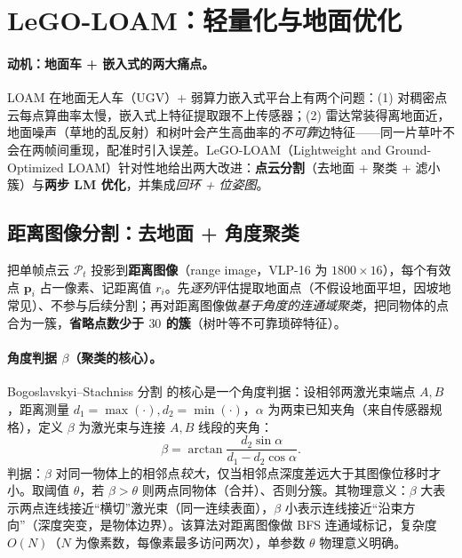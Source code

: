 \section{LeGO-LOAM：轻量化与地面优化}
\label{sec:lidar-lego}

\paragraph{动机：地面车 + 嵌入式的两大痛点。}
LOAM 在地面无人车（UGV）+ 弱算力嵌入式平台上有两个问题\cite{shan2018legoloam}：(1) 对稠密点云每点算曲率太慢，嵌入式上特征提取跟不上传感器；(2) 雷达常装得离地面近，地面噪声（草地的乱反射）和树叶会产生高曲率的\emph{不可靠}边特征——同一片草叶不会在两帧间重现，配准时引入误差。LeGO-LOAM（Lightweight and Ground-Optimized LOAM）针对性地给出两大改进：\textbf{点云分割}（去地面 + 聚类 + 滤小簇）与\textbf{两步 LM 优化}，并集成\emph{回环 + 位姿图}。

\subsection{距离图像分割：去地面 + 角度聚类}
\label{sec:lidar-lego-seg}

把单帧点云 $\mathcal{P}_t$ 投影到\textbf{距离图像}（range image，VLP-16 为 $1800\times16$），每个有效点 $\mathbf{p}_i$ 占一像素、记距离值 $r_i$\cite{shan2018legoloam}。先\emph{逐列}评估提取地面点（不假设地面平坦，因坡地常见）、不参与后续分割；再对距离图像做\emph{基于角度的连通域聚类}\cite{bogoslavskyi2016fast}，把同物体的点合为一簇，\textbf{省略点数少于 $30$ 的簇}（树叶等不可靠琐碎特征）。

\paragraph{角度判据 $\beta$（聚类的核心）。}
Bogoslavskyi–Stachniss 分割\cite{bogoslavskyi2016fast} 的核心是一个角度判据：设相邻两激光束端点 $A,B$，距离测量 $d_1=\max(\cdot),d_2=\min(\cdot)$，$\alpha$ 为两束已知夹角（来自传感器规格），定义 $\beta$ 为激光束与连接 $A,B$ 线段的夹角：
\begin{equation}
  \beta=\arctan\frac{d_2\sin\alpha}{d_1-d_2\cos\alpha}.
  \label{eq:lidar-bogo-beta}
\end{equation}
判据：$\beta$ 对同一物体上的相邻点\emph{较大}，仅当相邻点深度差远大于其图像位移时才小。取阈值 $\theta$，若 $\beta>\theta$ 则两点同物体（合并）、否则分簇。其物理意义：$\beta$ 大表示两点连线接近“横切”激光束（同一连续表面），$\beta$ 小表示连线接近“沿束方向”（深度突变，是物体边界）。该算法对距离图像做 BFS 连通域标记，复杂度 $O(N)$（$N$ 为像素数，每像素最多访问两次），单参数 $\theta$ 物理意义明确。

